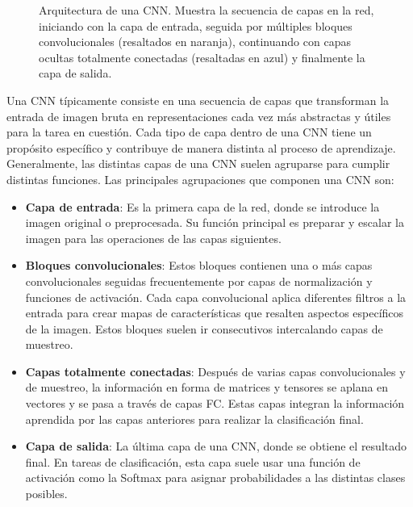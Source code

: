 \begin{figure}
\caption{Arquitectura de una CNN. Muestra la secuencia de capas en la red, iniciando con la capa de entrada, seguida por múltiples bloques convolucionales (resaltados en naranja), continuando con capas ocultas totalmente conectadas (resaltadas en azul) y finalmente la capa de salida. }
\end{figure}

Una CNN típicamente consiste en una secuencia de capas que transforman la entrada de imagen bruta en representaciones cada vez más abstractas y útiles para la tarea en cuestión. Cada tipo de capa dentro de una CNN tiene un propósito específico y contribuye de manera distinta al proceso de aprendizaje. Generalmente, las distintas capas de una CNN suelen agruparse para cumplir distintas funciones. Las principales agrupaciones que componen una CNN son:

\begin{itemize}
	\item \textbf{Capa de entrada}: Es la primera capa de la red, donde se introduce la imagen original o preprocesada. Su función principal es preparar y escalar la imagen para las operaciones de las capas siguientes.
	
	\item \textbf{Bloques convolucionales}: Estos bloques contienen una o más capas convolucionales seguidas frecuentemente por capas de normalización y funciones de activación. Cada capa convolucional aplica diferentes filtros a la entrada para crear mapas de características que resalten aspectos específicos de la imagen. Estos bloques suelen ir consecutivos intercalando capas de muestreo. 
	
	\item \textbf{Capas totalmente conectadas}: Después de varias capas convolucionales y de muestreo, la información en forma de matrices y tensores se aplana en vectores y se pasa a través de capas FC. Estas capas integran la información aprendida por las capas anteriores para realizar la clasificación final.
	
	\item \textbf{Capa de salida}: La última capa de una CNN, donde se obtiene el resultado final. En tareas de clasificación, esta capa suele usar una función de activación como la Softmax para asignar probabilidades a las distintas clases posibles.
\end{itemize}

